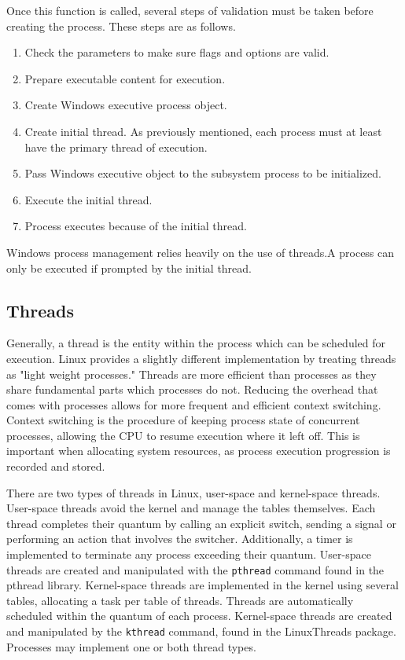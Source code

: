 \documentclass[10pt, onecolumn]{IEEEtran}
\begin{document}
        Once this function is called, several steps of validation must be taken before creating the process. These steps are as follows.
        
        \begin{enumerate}
            \item Check the parameters to make sure flags and options are valid.
            \item Prepare executable content for execution.
            \item Create Windows executive process object.
            \item Create initial thread. As previously mentioned, each process must at least have the primary thread of execution.
            \item Pass Windows executive object to the subsystem process to be initialized.
            \item Execute the initial thread.
            \item Process executes because of the initial thread.
        \end{enumerate}
        
        Windows process management relies heavily on the use of threads.A process can only be executed if prompted by the initial thread.
        
        
        
    \subsection*{Threads}
        Generally, a thread is the entity within the process which can be scheduled for execution. Linux provides a slightly different implementation by treating threads as "light weight processes." Threads are more efficient than processes as they share fundamental parts which processes do not. Reducing the overhead that comes with processes allows for more frequent and efficient context switching. Context switching is the procedure of keeping process state of concurrent processes, allowing the CPU to resume execution where it left off. This is important when allocating system resources, as process execution progression is recorded and stored. 
        
        \vspace{3mm}
        
        There are two types of threads in Linux, user-space and kernel-space threads\cite{linuxthread}. User-space threads avoid the kernel and manage the tables themselves. Each thread completes their quantum by calling an explicit switch, sending a signal or performing an action that involves the switcher. Additionally, a timer is implemented to terminate any process exceeding their quantum. User-space threads are created and manipulated with the \texttt{pthread} command found in the pthread library. Kernel-space threads are implemented in the kernel using several tables, allocating a task per table of threads. Threads are automatically scheduled within the quantum of each process. Kernel-space threads are created and manipulated by the \texttt{kthread} command, found in the LinuxThreads package. Processes may implement one or both thread types.
        
\end{document}

